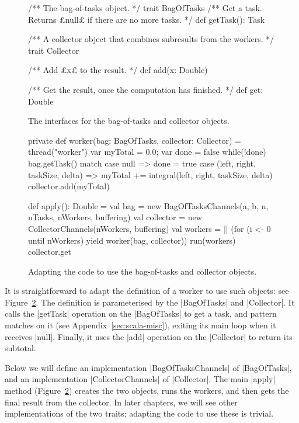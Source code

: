\begin{figure}
\begin{scala}
  /** The bag-of-tasks object. */
  trait BagOfTasks{
    /** Get a task.  Returns £null£ if there are no more tasks. */
    def getTask(): Task 
  }  

  /** A collector object that combines subresults from the workers. */
  trait Collector{
    /** Add £x£ to the result. */
    def add(x: Double) 

    /** Get the result, once the computation has finished. */
    def get: Double 
  }
\end{scala}
\caption{The interfaces for the bag-of-tasks and collector objects.}
\label{fig:BoT-interfaces}
\end{figure}


\begin{figure}
\begin{scala}
  private def worker(bag: BagOfTasks, collector: Collector) = thread("worker"){
    var myTotal = 0.0; var done = false
    while(!done) bag.getTask() match{
      case null => done = true
      case (left, right, taskSize, delta) =>
        myTotal += integral(left, right, taskSize, delta)
    }
    collector.add(myTotal)
  }

  def apply(): Double = {
    val bag = new BagOfTasksChannels(a, b, n, nTasks, nWorkers, buffering)
    val collector = new CollectorChannels(nWorkers, buffering)
    val workers = || (for (i <- 0 until nWorkers) yield worker(bag, collector))
    run(workers)
    collector.get
  }
\end{scala}
\caption{Adapting the code to use the bag-of-tasks and collector objects.}
\label{fig:BOT-using-objects}
\end{figure}

It is straightforward to adapt the definition of a worker to use such objects:
see Figure~\ref{fig:BOT-using-objects}.  The definition is parameterised by
the |BagOfTasks| and |Collector|.  It calls the |getTask| operation on the
|BagOfTasks| to get a task, and pattern matches on it (see
Appendix~\ref{sec:scala-misc}), exiting its main loop when it receives |null|.
Finally, it uses the |add| operation on the |Collector| to return its
subtotal.

Below we will define an implementation |BagOfTasksChannels| of |BagOfTasks|,
and an implementation |CollectorChannels| of |Collector|.  The main |apply|
method (Figure~\ref{fig:BOT-using-objects}) creates the two objects, runs the
workers, and then gets the final result from the collector.  In later
chapters, we will see other implementations of the two traits; adapting the
code to use these is  trivial.

